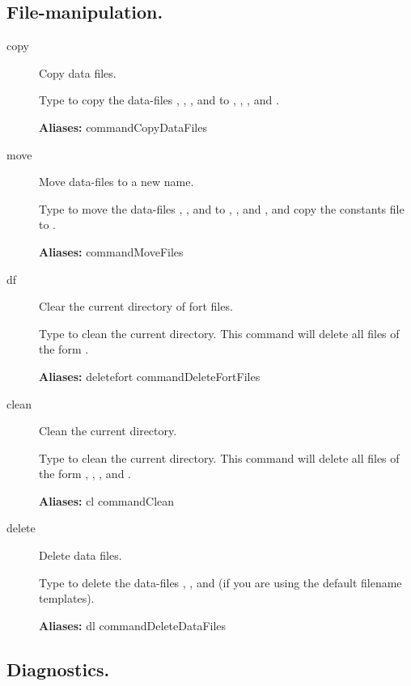 \documentclass[12pt]{report}
\begin{document}
\subsection{File-manipulation.} \label{sec:clui_ref_files}
\begin{description}
\item[copy]
Copy data files.

    Type  to copy the data-files ,
    , , and  to ,
    , , and .
    
\textbf{Aliases:} commandCopyDataFiles

\item[move]
Move data-files to a new name.

    Type  to move the data-files ,
    , and  to ,
    , and , and 
    copy the constants file  to .

\textbf{Aliases:} commandMoveFiles

\item[df]
Clear the current directory of fort files.

    Type  to clean the current directory.  This command will
    delete all files of the form .
    
\textbf{Aliases:} deletefort commandDeleteFortFiles

\item[clean]
Clean the current directory.

    Type  to clean the current directory.  This command will
    delete all files of the form , ,
    , and .
    
\textbf{Aliases:}
cl commandClean

\item[delete]
Delete data files.

    Type  to delete the data-files ,
    , and  (if you are using the default
    filename templates).
    
\textbf{Aliases:} dl commandDeleteDataFiles
\end{description}

\subsection{Diagnostics.} \label{sec:clui_ref_diagnostics}
\end{document}
